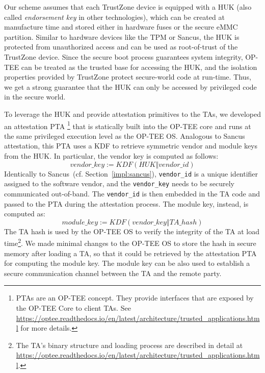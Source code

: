 Our scheme assumes that each TrustZone device is equipped with a \ac{HUK} (also
called \emph{endorsement key} in other technologies), which can be created at
manufacture time and stored either in hardware fuses or the secure eMMC
partition. Similar to hardware devices like the TPM or Sancus, the \ac{HUK} is
protected from unauthorized access and can be used as root-of-trust of the
TrustZone device. Since the secure boot process guarantees system integrity,
OP-TEE can be treated as the trusted base for accessing the \ac{HUK}, and the
isolation properties provided by TrustZone protect secure-world code at
run-time. Thus, we get a strong guarantee that the \ac{HUK} can only be accessed
by privileged code in the secure world.

To leverage the \ac{HUK} and provide attestation primitives to the TAs, we
developed an attestation \ac{PTA}%
%
\footnote{\label{note:trustzone-ta}PTAs are an OP-TEE concept. They
	provide interfaces that are exposed by the OP-TEE Core to client TAs. See
	\url{https://optee.readthedocs.io/en/latest/architecture/trusted_applications.html}
	for more details.}
%
that is statically built into the OP-TEE core and runs at the same privileged
execution level as the OP-TEE OS. Analogous to Sancus attestation, this \ac{PTA}
uses a \ac{KDF} to retrieve symmetric vendor and module keys from the \ac{HUK}.
In particular, the vendor key is computed as follows:%
\[ vendor\_key := KDF(HUK \mathbin\Vert vendor\_id) \]
%
Identically to Sancus~(cf. Section~\ref{impl:sancus}), \texttt{vendor\_id} is a
unique identifier assigned to the software vendor, and the \texttt{vendor\_key}
needs to be securely communicated out-of-band. The \texttt{vendor\_id} is then
embedded in the TA code and passed to the \ac{PTA} during the attestation
process. The module key, instead, is computed as:%
\[ module\_key := KDF(vendor\_key \mathbin\Vert TA\_hash) \]
%
The TA hash is used by the OP-TEE OS to verify the integrity of the TA at load
time\footnote{The TA's binary structure and loading process are described in
detail at
\url{https://optee.readthedocs.io/en/latest/architecture/trusted_applications.html}.}.
We made minimal changes to the OP-TEE OS to store the hash in secure memory
after loading a TA, so that it could be retrieved by the attestation \ac{PTA}
for computing the module key. The module key can be also used to establish a
secure communication channel between the TA and the remote party.


